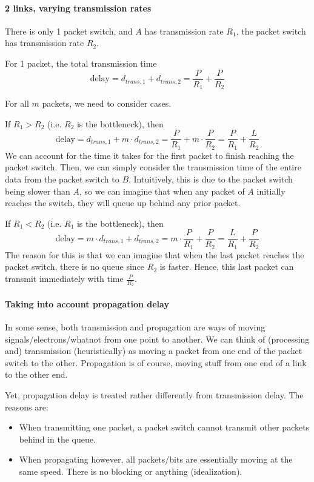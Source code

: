 \documentclass[a4paper]{article}
\begin{document}
\paragraph{2 links, varying transmission rates} There is only 1 packet switch, and $A$ has transmission rate $R_1$, the packet switch has transmission rate $R_2$.

For 1 packet, the total transmission time
\begin{equation}
	\text{delay} = d_{trans,1} + d_{trans,2} = \frac{P}{R_1} + \frac{P}{R_2}
\end{equation}

For all $m$ packets, we need to consider cases.

If $R_1 > R_2$ (i.e. $R_2$ is the bottleneck), then
\begin{equation}
	\text{delay} = d_{trans,1} + m\cdot d_{trans,2} = \frac{P}{R_1} + m\cdot \frac{P}{R_2} = \frac{P}{R_1} + \frac{L}{R_2}
\end{equation}
We can account for the time it takes for the first packet to finish reaching the packet switch. Then, we can simply consider the transmission time of the entire data from the packet switch to $B$. Intuitively, this is due to the packet switch being slower than $A$, so we can imagine that when any packet of $A$ initially reaches the switch, they will queue up behind any prior packet. 

If $R_1 < R_2$ (i.e. $R_1$ is the bottleneck), then
\begin{equation}
	\text{delay} = m\cdot d_{trans,1} + d_{trans,2} = m\cdot \frac{P}{R_1} + \frac{P}{R_2} = \frac{L}{R_1} + \frac{P}{R_2}
\end{equation}
The reason for this is that we can imagine that when the last packet reaches the packet switch, there is no queue since $R_2$ is faster. Hence, this last packet can transmit immediately with time $\frac{P}{R_2}$.

\paragraph{Taking into account propagation delay} In some sense, both transmission and propagation are ways of moving signals/electrons/whatnot from one point to another. We can think of (processing and) transmission (heuristically) as moving a packet from one end of the packet switch to the other. Propagation is of course, moving stuff from one end of a link to the other end.

Yet, propagation delay is treated rather differently from transmission delay. The reasons are:
\begin{itemize}
	\item When transmitting one packet, a packet switch cannot transmit other packets behind in the queue.
	\item When propagating however, all packets/bits are essentially moving at the same speed. There is no blocking or anything (idealization).
\end{itemize}
\end{document}

